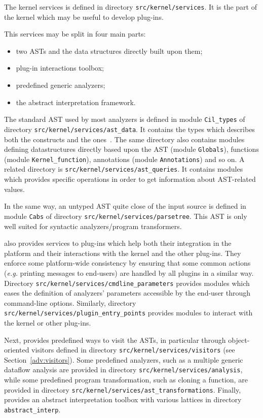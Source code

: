 The kernel services is defined in directory \texttt{src/kernel/services}. It
is the part of the \framac kernel which may be useful to develop plug-ins.

This services may be split in four main parts:
\begin{itemize}
\item two ASTs and the data structures directly built upon them;
\item plug-in interactions toolbox;
\item predefined generic analyzers;
\item the abstract interpretation framework.
\end{itemize}

The standard AST used by most analyzers is defined in module
\texttt{Cil\_types} of directory
\texttt{src/kernel/services/ast\_data}. It contains the types which describes
both the \C constructs and the \acsl ones~\cite{acsl}. The same directory also
contains modules defining datastructures directly based upon the AST (module
\texttt{Globals}), functions (module
\texttt{Kernel\_function}), annotations (module
\texttt{Annotations}) and so on. A related directory is
\texttt{src/kernel/services/ast\_queries}. It contains modules which provides
specific operations in order to get information about AST-related values.

In the same way, an untyped AST quite close of the \C input source is defined in
module \texttt{Cabs} of directory
\texttt{src/kernel/services/parsetree}. This AST is only well suited
for syntactic analyzers/program transformers.

\framac also provides services to plug-ins which help both their integration in
the platform and their interactions with the kernel and the other plug-ins. They
enforce some platform-wide consistency by ensuring that some common actions
(\emph{e.g.} printing messages to end-users) are handled by all plugins in a
similar way. Directory \texttt{src/kernel/services/cmdline\_parameters}
provides modules which eases the definition of analyzers' parameters accessible
by the end-user through command-line options. Similarly, directory
\texttt{src/kernel/services/plugin\_entry\_points} provides modules to interact
with the \framac kernel or other plug-ins.

Next, \framac provides predefined ways to visit the ASTs, in particular through
object-oriented visitors defined in directory
\texttt{src/kernel/services/visitors} (see Section~\ref{adv:visitors}).
Some predefined analyzers, such as a multiple generic dataflow analysis
are provided in directory \texttt{src/kernel/services/analysis}, while some
predefined program transformation, such as cloning a function, are provided in
directory \texttt{src/kernel/services/ast\_transformations}.
Finally, \framac provides an abstract interpretation
toolbox
with various lattices in directory \texttt{abstract\_interp}.

